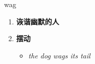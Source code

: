 
\begin{frame}
{\huge wag}
\begin{center}
\begin{enumerate}\Large
  \item \textbf{诙谐幽默的人}
  \item \textbf{摆动}
  \begin{itemize}
    \item \em{\Large{the dog wags its tail}}
  \end{itemize}
\end{enumerate}
\end{center}
\end{frame}
